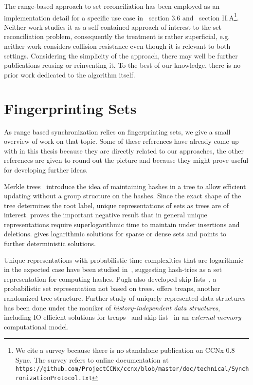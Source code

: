 
The range-based approach to set reconciliation has been employed as an implementation detail for a specific use case in~\cite{chen1999prototype} section 3.6 and~\cite{shang2017survey} section II.A\footnote{We cite a survey because there is no standalone publication on CCNx 0.8 Sync. The survey refers to online documentation at \texttt{https://github.com/ProjectCCNx/ccnx/blob/master/doc/technical/SynchronizationProtocol.txt}}. Neither work studies it as a self-contained approach of interest to the set reconciliation problem, consequently the treatment is rather superficial, e.g. neither work considers collision resistance even though it is relevant to both settings. Considering the simplicity of the approach, there may well be further publications reusing or reinventing it. To the best of our knowledge, there is no prior work dedicated to the algorithm itself.

\section{Fingerprinting Sets}

As range based synchronization relies on fingerprinting sets, we give a small overview of work on that topic. Some of these references have already come up with in this thesis because they are directly related to our approaches, the other references are given to round out the picture and because they might prove useful for developing further ideas.

Merkle trees~\cite{merkle1989certified} introduce the idea of maintaining hashes in a tree to allow efficient updating without a group structure on the hashes. Since the exact shape of the tree determines the root label, unique representations of sets as trees are of interest. \cite{uniquerepresentation} proves the important negative result that in general unique representations require superlogarithmic time to maintain under insertions and deletions. \cite{sundar1994unique} gives logarithmic solutions for sparse or dense sets and points to further deterministic solutions.

Unique representations with probabilistic time complexities that are logarithmic in the expected case have been studied in~\cite{pugh1989incremental}, suggesting hash-tries as a set representation for computing hashes. Pugh also developed skip lists~\cite{pugh1990skip}, a probabilistic set representation not based on trees. \cite{seidel1996randomized} offers treaps, another randomized tree structure. Further study of uniquely represented data structures has been done under the moniker of \textit{history-independent data structures}, including IO-efficient solutions for treaps~\cite{golovin2009b} and skip list~\cite{bender2016anti} in an \textit{external memory} computational model.

